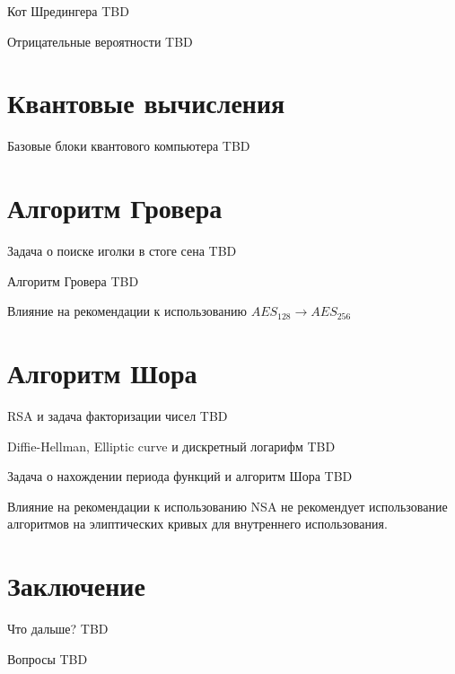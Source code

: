 \documentclass[10pt,pdf,hyperref={unicode}]{beamer}
\begin{document}
\begin{frame}{Кот Шредингера}
TBD
\end{frame}

\begin{frame}{Отрицательные вероятности}
TBD
\end{frame}

\section{Квантовые вычисления}
\begin{frame}{Базовые блоки квантового компьютера}
TBD
\end{frame}

\section{Алгоритм Гровера}
\begin{frame}{Задача о поиске иголки в стоге сена}
TBD
\end{frame}

\begin{frame}{Алгоритм Гровера}
TBD
\end{frame}

\begin{frame}{Влияние на рекомендации к использованию}
$AES_{128} \rightarrow AES_{256}$
\end{frame}

\section{Алгоритм Шора}
\begin{frame}{RSA и задача факторизации чисел}
TBD
\end{frame}

\begin{frame}{Diffie-Hellman, Elliptic
curve и дискретный логарифм}
TBD
\end{frame}

\begin{frame}{Задача о нахождении периода функций и алгоритм Шора}
TBD
\end{frame}

\begin{frame}{Влияние на рекомендации к использованию}
NSA не рекомендует использование алгоритмов на элиптических кривых для
внутреннего использования.
\end{frame}

\section{Заключение}
\begin{frame}{Что дальше?}
TBD
\end{frame}

\begin{frame}{Вопросы}
TBD
\end{frame}
\end{document}
